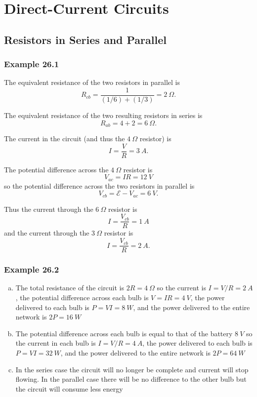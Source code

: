 \documentclass{article}
\begin{document}
\section{Direct-Current Circuits}

\subsection{Resistors in Series and Parallel}

\subsubsection{Example 26.1}

The equivalent resistance of the two resistors in parallel is \[R_{cb} = \frac{1}{(1 / 6) + (1 / 3)} = \qty{2}{\Omega}.\]

The equivalent resistance of the two resulting resistors in series is \[R_{ab} = 4 + 2 = \qty{6}{\Omega}.\]

The current in the circuit (and thus the $\qty{4}{\Omega}$ resistor) is \[I = \frac{V}{R} = \qty{3}{A}.\]

The potential difference across the $\qty{4}{\Omega}$ resistor is \[V_{ac} = I R = \qty{12}{V}\] so the potential difference across the two resistors in parallel is \[V_{cb} = \mathcal{E} - V_{ac} = \qty{6}{V}.\]

Thus the current through the $\qty{6}{\Omega}$ resistor is \[I = \frac{V_{cb}}{R} = \qty{1}{A}\] and the current through the $\qty{3}{\Omega}$ resistor is \[I = \frac{V_{cb}}{R} = \qty{2}{A}.\]

\subsubsection{Example 26.2}

\begin{enumerate}[(a)]
  \item The total resistance of the circuit is $2 R = \qty{4}{\Omega}$ so the current is $I = V / R = \qty{2}{A}$, the potential difference across each bulb is $V = I R = \qty{4}{V}$, the power delivered to each bulb is $P = V I = \qty{8}{W}$, and the power delivered to the entire network is $2 P = \qty{16}{W}$

  \item The potential difference across each bulb is equal to that of the battery $\qty{8}{V}$ so the current in each bulb is $I = V / R = \qty{4}{A}$, the power delivered to each bulb is $P = V I = \qty{32}{W}$, and the power delivered to the entire network is $2 P = \qty{64}{W}$

  \item In the series case the circuit will no longer be complete and current will stop flowing. In the parallel case there will be no difference to the other bulb but the circuit will consume less energy
\end{enumerate}
\end{document}
